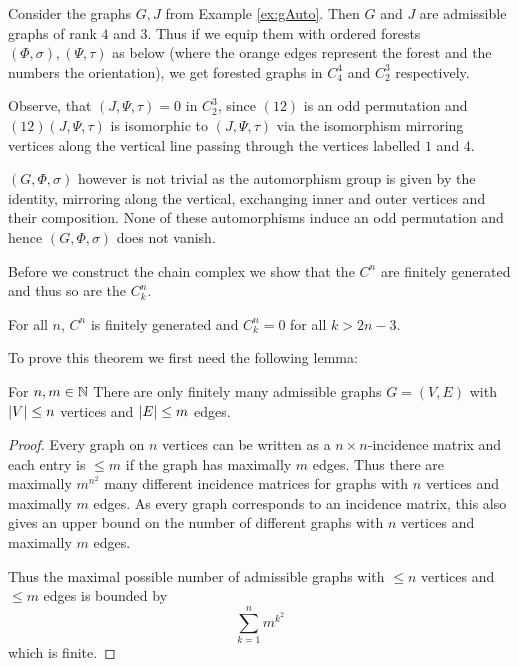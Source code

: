 \begin{eg}\label{ex:fg}
	Consider the graphs $G, J$ from Example \ref{ex:gAuto}. Then $G$ and $J$ are admissible graphs of rank $4$ and $3$. Thus if we equip them with ordered forests 
	$(\Phi,\sigma), (\Psi,\tau)$ as below 
	(where the orange edges represent the forest and the numbers the orientation), we get forested graphs in $C^{4}_{4}$ and $C^{3}_{2}$ respectively.


	Observe, that $(J,\Psi,\tau) = 0$ in $C_{2}^{3}$, since $ (1 2)$ is an odd permutation and  $(1 2) (J,\Psi,\tau)$ is isomorphic to $(J,\Psi,\tau)$ 
	via the isomorphism mirroring vertices along the vertical line passing through the vertices labelled $1$ and $4$.

	$(G,\Phi,\sigma)$ however is not trivial as the automorphism group is given by the identity,
	mirroring along the vertical, exchanging inner and outer vertices and their composition.
	None of these automorphisms induce an odd permutation and hence $(G,\Phi,\sigma)$ does not vanish.
\end{eg}

Before we construct the chain complex we show that the $C^{n}$ are finitely generated and thus so are the $C_{k}^{n}$.

\begin{theorem}\label{thm:finGenCn}
	For all $n$, $C^{n}$ is finitely generated and $C_{k}^{n} = 0$ for all $k > 2n-3$. 
\end{theorem}

To prove this theorem we first need the following lemma:
\begin{lemma}
	For $n,m \in \mathbb{N}$ There are only finitely many admissible graphs $G = (V,E)$ with $\abs{V} \leq n$ vertices and $ \abs{E} \leq m$ edges.
\end{lemma}

\begin{proof}
	Every graph on $n$ vertices can be written as a $n\times n$-incidence matrix and each entry is $\leq m$ if the graph has maximally $m$ edges. 
	Thus there are maximally $m^{n^2}$ many different incidence matrices for graphs with  $n$ vertices and maximally $m$ edges.
	As every graph corresponds to an incidence matrix, this also gives an upper bound on the number of different graphs with $n$ vertices
	and maximally $m$ edges.

	Thus the maximal possible number of admissible graphs with $\leq n$ vertices and $\leq m$ edges is bounded by
	\[
		\sum_{k=1}^{n} m^{k^2} 
	\]
	which is finite.
\end{proof}

